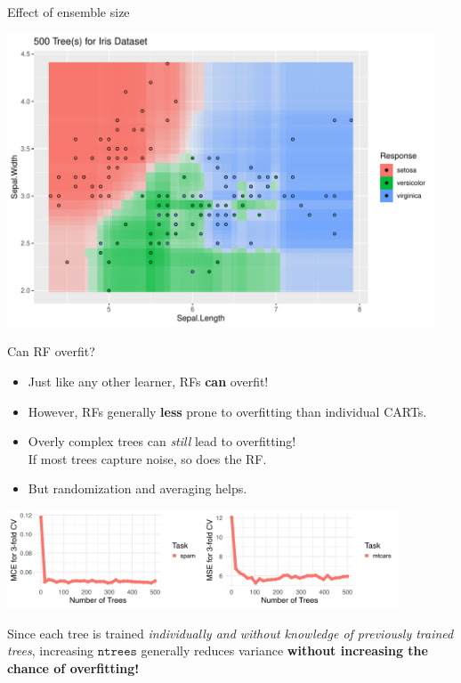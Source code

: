 \documentclass[11pt,compress,t,notes=noshow, xcolor=table]{beamer}
\begin{document}
\begin{vbframe}{Effect of ensemble size}
\addtocounter{framenumber}{-1}
{\centering \includegraphics[width=0.95\textwidth]{figure/cart_forest_intro_3}}
\end{vbframe}

\begin{vbframe}{Can RF overfit? }

{\small
\begin{itemize}
  \item Just like any other learner, RFs \textbf{can} overfit!\\
  \item However, RFs generally \textbf{less} prone to overfitting than individual CARTs.
  \item Overly complex trees can \textit{still} lead to overfitting!\\
    If most trees capture noise, so does the RF.
  \item But randomization and averaging helps.
\end{itemize}

\begin{center}
\includegraphics[width=330pt]{figure/forest-ntree.png}
\end{center}


Since each tree is trained \textit{individually and without knowledge of previously trained trees}, increasing $\texttt{ntrees}$ generally reduces variance \textbf{without increasing the chance of overfitting!}
}
\end{vbframe}
\end{document}

